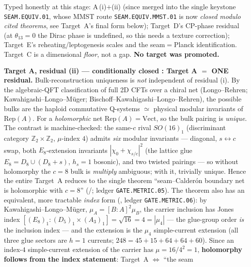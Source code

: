 \documentclass[11pt,a4paper]{article}
\begin{document}
\begin{winbox}
\smallskip\noindent Typed honestly at this stage: A\,(i)$+$(ii) (since merged into the single keystone
\texttt{SEAM.EQUIV.01}, whose MMST route \texttt{SEAM.EQUIV.MMST.01} is now \emph{closed modulo cited theorems}, see Target~A's final form below);
Target~D's CP-phase residual (at $\theta_{13}=0$ the
Dirac phase is undefined, so this needs a texture correction); Target~E's reheating/leptogenesis scales and the
seam$=$Planck identification. Target~C is a dimensional \emph{floor}, not a gap. \textbf{No target was promoted.}
\end{winbox}

\begin{winbox}
\smallskip\noindent\textbf{Target A, residual (ii) --- conditionally closed \mE: Target A $=$ ONE residual.}
Bulk-reconstruction uniqueness is \emph{not} independent of residual (i). By the algebraic-QFT classification of
full 2D CFTs over a chiral net (Longo--Rehren; Kawahigashi--Longo--M\"uger; Bischoff--Kawahigashi--Longo--Rehren),
the possible bulks are the haploid commutative Q-systems $\simeq$ physical modular invariants of $\mathrm{Rep}(A)$.
For a \emph{holomorphic} net $\mathrm{Rep}(A)=\mathrm{Vect}$, so the bulk pairing is \emph{unique}. The contrast is
machine-checked: the same-$c$ rival $SO(16)_1$ (discriminant category $\mathbb Z_2{\times}\mathbb Z_2$, $\mu$-index $4$) admits
\emph{six} modular invariants --- diagonal, $s{\leftrightarrow}c$ swap, both $E_8$-extension invariants
$|\chi_0{+}\chi_{s/c}|^2$ (the lattice glue $E_8=D_8\cup(D_8{+}s)$, $h_s{=}1$ bosonic), and two twisted pairings ---
so without holomorphy the $c=8$ bulk is \emph{multiply} ambiguous; with it, trivially unique. Hence the entire
Target~A reduces to the single theorem ``seam--Calder\'on boundary net is holomorphic with $c=8$'' (\mC/\mO;
ledger \texttt{GATE.METRIC.05}). The theorem also has an equivalent, more tractable \emph{index} form
(, ledger \texttt{GATE.METRIC.06}): by Kawahigashi--Longo--M\"uger,
$\mu_A=[B{:}A]^2\mu_B$, the carrier inclusion has Jones index
$[(E_8)_1:(D_5)_1{\times}(A_3)_1]=\sqrt{16}=4=|\mu_4|$ --- the glue-group order \emph{is} the inclusion
index --- and the extension is the $\mu_4$ simple-current extension (all three glue sectors are $h=1$
currents; $248=45{+}15{+}64{+}64{+}60$). Since an index-$4$ simple-current extension of the carrier has
$\mu=16/4^2=1$, \textbf{holomorphy follows from the index statement}: Target~A $\Leftrightarrow$ ``the seam

\end{winbox}
\end{document}
